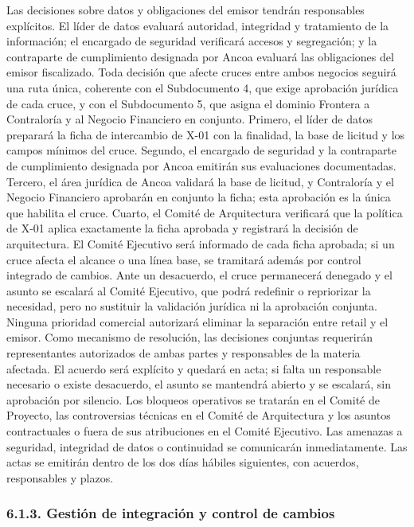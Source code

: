 \documentclass[11pt]{article}
\begin{document}
Las decisiones sobre datos y obligaciones del emisor tendrán
responsables explícitos. El líder de datos evaluará autoridad,
integridad y tratamiento de la información; el encargado de seguridad
verificará accesos y segregación; y la contraparte de cumplimiento
designada por Ancoa evaluará las obligaciones del emisor fiscalizado.
Toda decisión que afecte cruces entre ambos negocios seguirá una ruta única, coherente con el Subdocumento 4, que exige aprobación jurídica de cada cruce, y con el Subdocumento 5, que asigna el dominio Frontera a Contraloría y al Negocio Financiero en conjunto. Primero, el líder de datos preparará la ficha de intercambio de X-01 con la finalidad, la base de licitud y los campos mínimos del cruce. Segundo, el encargado de seguridad y la contraparte de cumplimiento designada por Ancoa emitirán sus evaluaciones documentadas. Tercero, el área jurídica de Ancoa validará la base de licitud, y Contraloría y el Negocio Financiero aprobarán en conjunto la ficha; esta aprobación es la única que habilita el cruce. Cuarto, el Comité de Arquitectura verificará que la política de X-01 aplica exactamente la ficha aprobada y registrará la decisión de arquitectura. El Comité Ejecutivo será informado de cada ficha aprobada; si un cruce afecta el alcance o una línea base, se tramitará además por control integrado de cambios. Ante un desacuerdo, el cruce permanecerá denegado y el asunto se escalará al Comité Ejecutivo, que podrá redefinir o repriorizar la necesidad, pero no sustituir la validación jurídica ni la aprobación conjunta. Ninguna prioridad comercial autorizará eliminar la separación entre retail y el emisor. Como mecanismo de resolución, las
decisiones conjuntas requerirán representantes autorizados de ambas
partes y responsables de la materia afectada. El acuerdo será explícito
y quedará en acta; si falta un responsable necesario o existe
desacuerdo, el asunto se mantendrá abierto y se escalará, sin aprobación
por silencio. Los bloqueos operativos se tratarán en el Comité de
Proyecto, las controversias técnicas en el Comité de Arquitectura y los
asuntos contractuales o fuera de sus atribuciones en el Comité
Ejecutivo. Las amenazas a seguridad, integridad de datos o continuidad
se comunicarán inmediatamente. Las actas se emitirán dentro de los dos
días hábiles siguientes, con acuerdos, responsables y plazos.

\subsubsection{6.1.3. Gestión de integración y control de cambios}\label{6-1-3-gestion-de-integracion-y-control-de-cambios}
\end{document}

